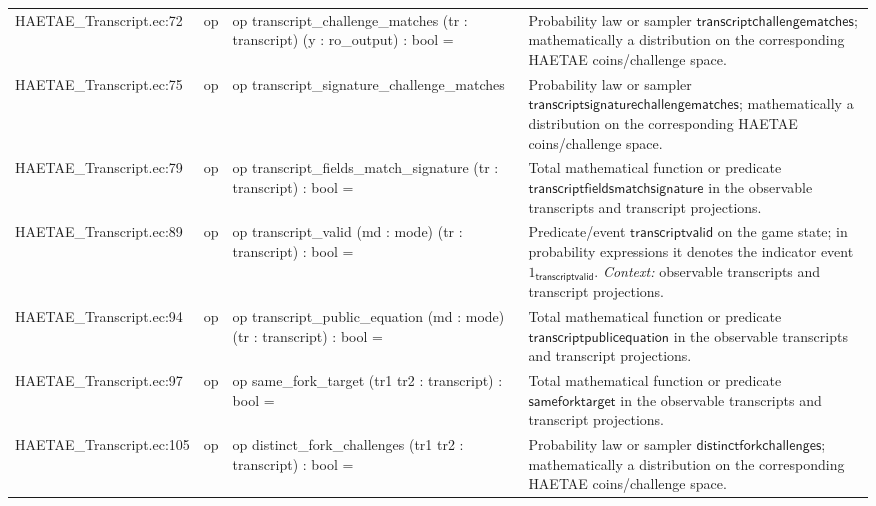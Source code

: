 \documentclass[10pt]{article}
\begin{document}
\begin{longtable}{L{0.11\textwidth}L{0.055\textwidth}L{0.385\textwidth}L{0.41\textwidth}}
HAETAE\_\allowbreak{}Transcript.\allowbreak{}ec:\allowbreak{}72 & op & {\ttfamily\scriptsize op transcript\_\allowbreak{}challenge\_\allowbreak{}matches (tr : transcript) (y : ro\_\allowbreak{}output) : bool =} & Probability law or sampler $\mathsf{transcriptchallengematches}$; mathematically a distribution on the corresponding HAETAE coins/challenge space. \\
HAETAE\_\allowbreak{}Transcript.\allowbreak{}ec:\allowbreak{}75 & op & {\ttfamily\scriptsize op transcript\_\allowbreak{}signature\_\allowbreak{}challenge\_\allowbreak{}matches} & Probability law or sampler $\mathsf{transcriptsignaturechallengematches}$; mathematically a distribution on the corresponding HAETAE coins/challenge space. \\
HAETAE\_\allowbreak{}Transcript.\allowbreak{}ec:\allowbreak{}79 & op & {\ttfamily\scriptsize op transcript\_\allowbreak{}fields\_\allowbreak{}match\_\allowbreak{}signature (tr : transcript) : bool =} & Total mathematical function or predicate $\mathsf{transcriptfieldsmatchsignature}$ in the observable transcripts and transcript projections. \\
HAETAE\_\allowbreak{}Transcript.\allowbreak{}ec:\allowbreak{}89 & op & {\ttfamily\scriptsize op transcript\_\allowbreak{}valid (md : mode) (tr : transcript) : bool =} & Predicate/event $\mathsf{transcriptvalid}$ on the game state; in probability expressions it denotes the indicator event $1_{\mathsf{transcriptvalid}}$. \emph{Context:} observable transcripts and transcript projections. \\
HAETAE\_\allowbreak{}Transcript.\allowbreak{}ec:\allowbreak{}94 & op & {\ttfamily\scriptsize op transcript\_\allowbreak{}public\_\allowbreak{}equation (md : mode) (tr : transcript) : bool =} & Total mathematical function or predicate $\mathsf{transcriptpublicequation}$ in the observable transcripts and transcript projections. \\
HAETAE\_\allowbreak{}Transcript.\allowbreak{}ec:\allowbreak{}97 & op & {\ttfamily\scriptsize op same\_\allowbreak{}fork\_\allowbreak{}target (tr1 tr2 : transcript) : bool =} & Total mathematical function or predicate $\mathsf{sameforktarget}$ in the observable transcripts and transcript projections. \\
HAETAE\_\allowbreak{}Transcript.\allowbreak{}ec:\allowbreak{}105 & op & {\ttfamily\scriptsize op distinct\_\allowbreak{}fork\_\allowbreak{}challenges (tr1 tr2 : transcript) : bool =} & Probability law or sampler $\mathsf{distinctforkchallenges}$; mathematically a distribution on the corresponding HAETAE coins/challenge space. \\

\end{longtable}
\end{document}
